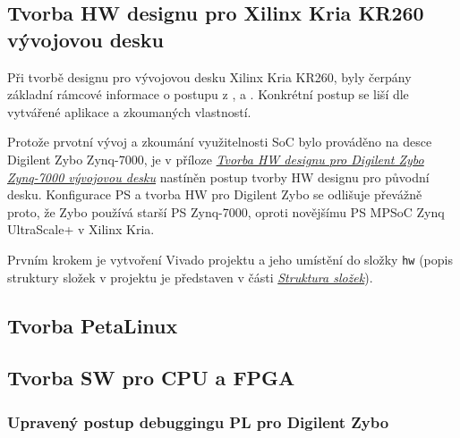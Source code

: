 \documentclass[a4paper, twoside, 11pt]{article}
\newcommand{\fbar}{\FloatBarrier}
\begin{document}
		
		\subsection{Tvorba HW designu pro Xilinx Kria KR260 vývojovou desku}
				Při tvorbě designu pro vývojovou desku Xilinx Kria KR260, byly čerpány základní rámcové informace o postupu z \cite{hackster-getting-started-with-the-kria-kr260-in-petalinux}, \cite{hackster-add-peripherial-support-to-kria-kr260-vivado} a \cite{hackster-getting-started-with-the-kria-kr260-in-vivado}. Konkrétní postup se liší dle vytvářené aplikace a zkoumaných vlastností.\par
				Protože prvotní vývoj a zkoumání využitelnosti SoC bylo prováděno na desce Digilent Zybo Zynq-7000, je v příloze \hyperref[sec:appendicies:-tvorba-hw-designu-pro-digilent-zybo-zynq-7000-vyvojovou-desku]{\textit{Tvorba HW designu pro Digilent Zybo Zynq-7000
				vývojovou desku}} nastíněn postup tvorby HW designu pro původní desku. Konfigurace PS a tvorba HW pro Digilent Zybo se odlišuje převážně proto, že Zybo používá starší PS Zynq-7000, oproti novějšímu PS MPSoC Zynq UltraScale+ v Xilinx Kria.\par
				Prvním krokem je vytvoření Vivado projektu a jeho umístění do složky \texttt{hw} (popis struktury složek v projektu je představen v části \hyperref[sec:struktura-slozek]{\textit{Struktura složek}}).

		



	\fbar
	\subsection{Tvorba PetaLinux}\label{subsec:tvorba-petalinux}
	\subsection{Tvorba SW pro CPU a FPGA}
	\subsubsection{Upravený postup debuggingu PL pro Digilent Zybo}
\end{document}
